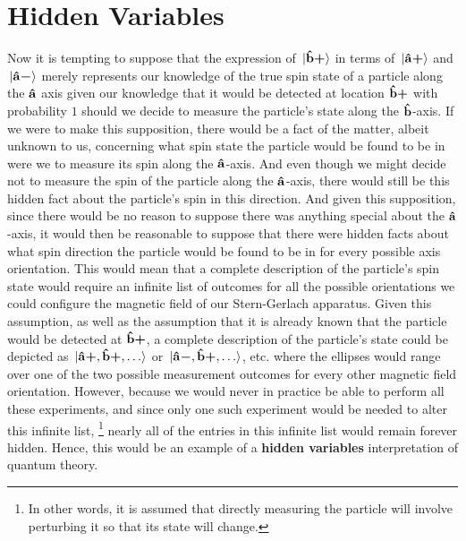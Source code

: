 \documentclass[letter, 12pt]{turabian-thesis}
\theoremstyle{hypothesis}
\newcommand{\uvb}[1]{\vb{\hat{{#1}}}}
\newcommand{\uvbp}[1]{\uvb{#1}\bm{+}}
\newcommand{\uvbm}[1]{\uvb{#1}\bm{-}}
\let\origfootnote\footnote %
\renewcommand{\footnote}[1]{%
\noindent %
\origfootnote{#1}}
\begin{document}
\section{Hidden Variables }
Now it is tempting to suppose that the expression of $\ket*{\uvbp{b}}$ in terms of $\ket*{\uvbp{a}}$ and $\ket*{\uvbm{a}}$ merely represents our knowledge of the true spin state of a particle along the $\uvb{a}$ axis given our knowledge that it would be detected at location $\uvbp{b}$ with probability $1$ should we decide to measure the particle's state along the $\uvb{b}$-axis. If we were to make this supposition, there would be a fact of the matter, albeit unknown to us, concerning what spin state the particle would be found to be in  were we to measure its spin along the $\uvb{a}$-axis. And  even though we might decide not to measure the spin of the particle along the $\uvb{a}$-axis, there would still be this hidden fact about the particle's spin in this direction. And given this supposition, since there would be no reason to suppose there was anything special about the $\uvb{a}$-axis, it would then be reasonable to suppose that there were hidden facts about what spin direction the particle would be found to be in for every possible axis orientation. This would mean that a complete description of the particle's spin state would require an infinite list of outcomes for all the possible orientations we could configure the magnetic field of our Stern-Gerlach apparatus. Given this assumption, as well as the assumption that it is already known that the particle would be detected at $\uvbp{b}$, a complete description of the particle's  state could be depicted as $\ket*{\uvbp{a},\uvbp{b},\ldots}$ or  $\ket*{\uvbm{a},\uvbp{b},\ldots}$, etc. where the ellipses would range over one of the two possible measurement outcomes for every other magnetic field orientation. However, because we would never in practice be able to perform all these experiments, and since only one such experiment would be needed to alter this infinite list,\footnote{In other words, it is assumed that directly measuring the particle will involve perturbing it so that its state will change.} nearly all of the entries in this infinite list would remain forever hidden. Hence, this would be an example of a \textbf{hidden variables} interpretation of quantum theory.  
\end{document}
